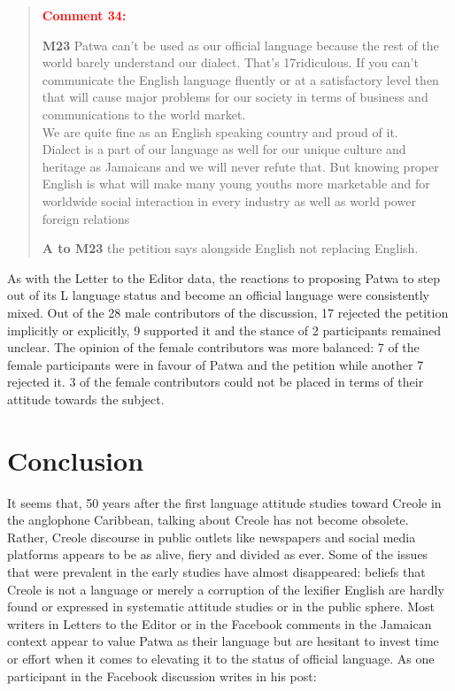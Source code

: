 \documentclass[output=paper,colorlinks,citecolor=brown]{langscibook}
\begin{document}
\begin{quote}
\textcolor[HTML]{FF0000}{\textbf{Comment 34:}}

\textbf{M23} Patwa can’t be used as our official language because the rest of the world barely understand our dialect. That’s 17ridiculous. If you can’t communicate the English language fluently or at a satisfactory level then that will cause major problems for our society in terms of business and communications to the world market.\\
\noindent We are quite fine as an English speaking country and proud of it.\\
\noindent Dialect is a part of our language as well for our unique culture and heritage as Jamaicans and we will never refute that. But knowing proper English is what will make many young youths more marketable and for worldwide social interaction in every industry as well as world power foreign relations

\textbf{A to M23} the petition says alongside English not replacing English. \\
\end{quote}

As with the Letter to the Editor data, the reactions to proposing Patwa to step out of its L language status and become an official language were consistently mixed. Out of the 28 male contributors of the discussion, 17 rejected the petition implicitly or explicitly, 9 supported it and the stance of 2 participants remained unclear. The opinion of the female contributors was more balanced: 7 of the female participants were in favour of Patwa and the petition while another 7 rejected it. 3 of the female contributors could not be placed in terms of their attitude towards the subject.


\section{Conclusion}\label{sec:muehleisen:5}
It seems that, 50 years after the first language attitude studies toward  Creole in the anglophone Caribbean, talking about Creole has not become obsolete. Rather, Creole discourse in public outlets like newspapers and social media platforms appears to be as alive, fiery and divided as ever. Some of the issues that were prevalent in the early studies have almost disappeared: beliefs that Creole is not a language or merely a corruption of the lexifier English are hardly found or expressed in systematic attitude studies or in the public sphere. Most writers in Letters to the Editor or in the Facebook comments in the Jamaican context appear to value Patwa as their language but are hesitant to invest time or effort when it comes to elevating it to the status of official language. As one participant in the Facebook discussion writes in his post:
\end{document}
